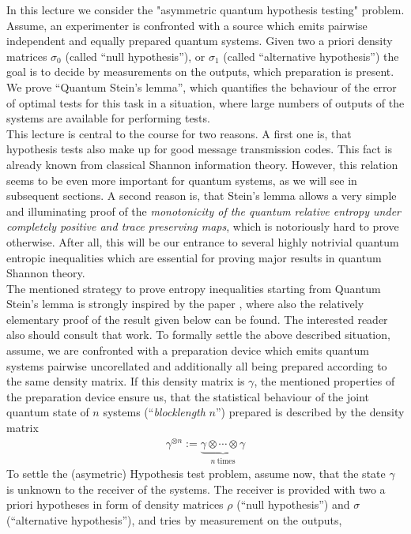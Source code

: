 In this lecture we consider the "asymmetric quantum hypothesis testing" problem. Assume, an experimenter is confronted with a source which emits pairwise independent and equally prepared quantum systems. Given two a priori density matrices  
$\sigma_0$ (called ``null hypothesis''), or $\sigma_1$ (called ``alternative hypothesis'') the goal is to decide by measurements on the outputs, which preparation is present. 
We prove ``Quantum  Stein's lemma'', 
which quantifies the behaviour of the error of optimal tests for this task in a situation, where large numbers of outputs of the systems are available for 
performing tests. \\
This lecture is central to the course for two reasons. A first one is, that hypothesis tests also make up for good  message transmission codes. This fact is already known
from classical Shannon information theory. However, this relation seems to be even more important for quantum systems, as we will see in subsequent sections. A second reason
is, that Stein's lemma allows a very simple and illuminating proof of the \emph{monotonicity of the quantum relative entropy under completely positive and trace preserving maps}, 
which is notoriously hard to prove otherwise. After all, this will be our entrance to several highly notrivial quantum entropic inequalities which are essential for proving 
major results in quantum Shannon theory. \\
The mentioned strategy to prove entropy inequalities starting from Quantum Stein's lemma is strongly inspired by the paper \cite{bjelakovic12a}, where also the relatively elementary proof 
of the result given below can be found. The interested reader also should consult that work. 
To formally settle the above described situation, assume, we are confronted with a preparation device which emits quantum systems pairwise uncorellated and 
additionally all being prepared according to the same density matrix. If this density matrix is $\gamma$, the mentioned properties of the preparation device ensure us, that 
the statistical behaviour of the joint quantum state of $n$ systems (``\emph{blocklength} $n$'') prepared is described by the density matrix 
\begin{align*}
\gamma^{\otimes n} := \underbrace{\gamma \otimes \cdots \otimes \gamma}_{n \ \text{times}}
\end{align*}
To settle the (asymetric) Hypothesis test problem, assume now, that the state $\gamma$ is unknown to the receiver of the systems. The receiver is provided with two 
a priori hypotheses in form of density matrices $\rho$ (``null hypothesis'') and $\sigma$ (``alternative hypothesis''), and tries by measurement on the outputs,
